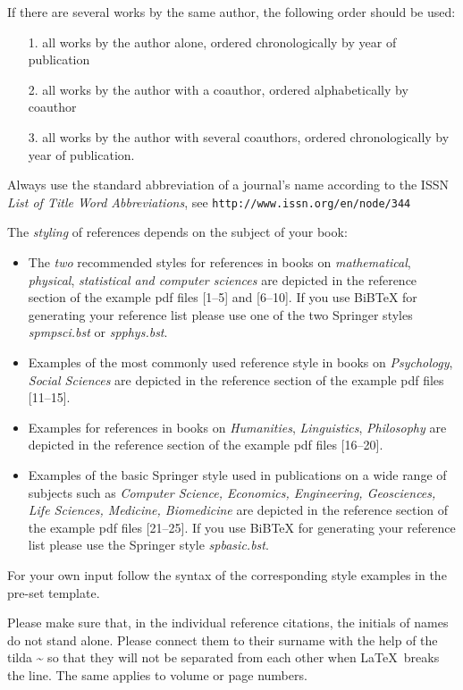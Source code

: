 \documentclass[graybox]{svmono}
\begin{document}
If there are several works by the same author, the following order should be used:

\begin{enumerate}
\item[1.] all works by the author alone, ordered chronologically by year of publication
\item[2.] all works by the author with a coauthor, ordered alphabetically by coauthor
\item[3.] all works by the author with several coauthors, ordered chronologically by year of publication.
\end{enumerate}

Always use the standard abbreviation of a journal's name according to the ISSN \textit{List of Title Word Abbreviations}, see \texttt{http://www.issn.org/en/node/344}

The \emph{styling} of references depends on the subject of your book:

\begin{itemize}
\item The \emph{two} recommended styles for references in books on \emph{mathematical}, \emph{physical}, \emph{statistical and computer sciences} are depicted in the reference section of the example pdf files [1--5] and [6--10]. If you use BiBTeX for generating your reference list please use one of the two Springer styles \emph{spmpsci.bst} or \emph{spphys.bst}.
\item Examples of the most commonly used reference style in books on \emph{Psychology}, \emph{Social Sciences} are depicted in the reference section of the example pdf files [11--15].
\item Examples for references in books on \emph{Humanities}, \emph{Linguistics}, \emph{Philosophy} are depicted in the reference section of the example pdf files [16--20].
\item Examples of the basic Springer style used in publications on a wide range of subjects such as \emph{Computer Science, Economics, Engineering, Geosciences, Life Sciences, Medicine, Biomedicine} are depicted in the reference section of the example pdf files [21--25]. If you use BiBTeX for generating your reference list please use the Springer style \emph{spbasic.bst}.
\end{itemize}

For your own input follow the syntax of the corresponding style examples in the pre-set template.

Please make sure that, in the individual reference citations, the initials of names do not stand alone. Please connect them to their surname with the help of the tilda \~{} so that they will not be separated from each other when \LaTeX~breaks the line. The same applies to volume or page numbers.
\end{document}
